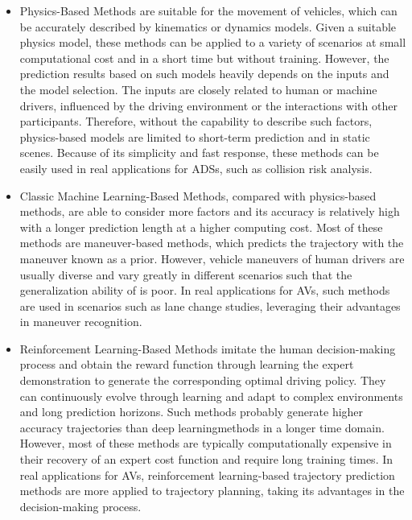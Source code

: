 \begin{itemize}
	\item Physics-Based Methods are suitable for the movement of vehicles, which can be accurately described by kinematics or dynamics models. Given a suitable physics model, these methods can be applied to a variety of scenarios at small computational cost and in a short time but without training. However, the prediction results based on such models heavily depends on the inputs and the model selection. The inputs are closely related to human or machine drivers, influenced by the driving environment or the interactions with other participants. Therefore, without the capability to describe such factors, physics-based models are limited to short-term prediction and in static scenes. Because of its simplicity and fast response, these methods can be easily used in real applications for \acp{ADS}, such as collision risk analysis.
	\item Classic Machine Learning-Based Methods, compared with physics-based methods, are able to consider more factors and its accuracy is relatively high with a longer prediction length at a higher computing cost. Most of these methods are maneuver-based methods, which predicts the trajectory with the maneuver known as a prior. However, vehicle maneuvers of human drivers are usually diverse and vary greatly in different scenarios such that the generalization ability of is poor. In real applications for AVs, such methods are used in scenarios such as lane change studies, leveraging their advantages in maneuver recognition.
	\item Reinforcement Learning-Based Methods imitate the human decision-making process and obtain the reward function through learning the expert demonstration to generate the corresponding optimal driving policy. They can continuously evolve through learning and adapt to complex environments and long prediction horizons. Such methods probably generate higher accuracy trajectories than deep learningmethods in a longer time domain. However, most of these methods are typically computationally expensive in their recovery of an expert cost function and require long training times. In real applications for AVs, reinforcement learning-based trajectory prediction methods are more applied to trajectory planning, taking its advantages in the decision-making process.

\end{itemize}
